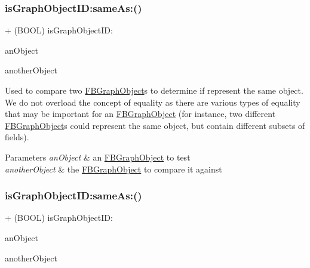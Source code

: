 \subsubsection{\texorpdfstring{is\+Graph\+Object\+I\+D\+:same\+As\+:()}{isGraphObjectID:sameAs:()}\hspace{0.1cm}{\footnotesize\ttfamily [4/5]}}
{\footnotesize\ttfamily + (B\+O\+OL) is\+Graph\+Object\+I\+D\+: \begin{DoxyParamCaption}\item[{(id$<$ \hyperlink{interfaceFBGraphObject}{F\+B\+Graph\+Object} $>$)}]{an\+Object }\item[{sameAs:(id$<$ \hyperlink{interfaceFBGraphObject}{F\+B\+Graph\+Object} $>$)}]{another\+Object }\end{DoxyParamCaption}}

Used to compare two {\ttfamily \hyperlink{interfaceFBGraphObject}{F\+B\+Graph\+Object}}s to determine if represent the same object. We do not overload the concept of equality as there are various types of equality that may be important for an {\ttfamily \hyperlink{interfaceFBGraphObject}{F\+B\+Graph\+Object}} (for instance, two different {\ttfamily \hyperlink{interfaceFBGraphObject}{F\+B\+Graph\+Object}}s could represent the same object, but contain different subsets of fields).


\begin{DoxyParams}{Parameters}
{\em an\+Object} & an {\ttfamily \hyperlink{interfaceFBGraphObject}{F\+B\+Graph\+Object}} to test\\
\hline
{\em another\+Object} & the {\ttfamily \hyperlink{interfaceFBGraphObject}{F\+B\+Graph\+Object}} to compare it against \\
\hline
\end{DoxyParams}
\mbox{\label{interfaceFBGraphObject_a62b9fd3318de27294b10860c9a62160c}} 
\subsubsection{\texorpdfstring{is\+Graph\+Object\+I\+D\+:same\+As\+:()}{isGraphObjectID:sameAs:()}\hspace{0.1cm}{\footnotesize\ttfamily [5/5]}}
{\footnotesize\ttfamily + (B\+O\+OL) is\+Graph\+Object\+I\+D\+: \begin{DoxyParamCaption}\item[{(id$<$ \hyperlink{interfaceFBGraphObject}{F\+B\+Graph\+Object} $>$)}]{an\+Object }\item[{sameAs:(id$<$ \hyperlink{interfaceFBGraphObject}{F\+B\+Graph\+Object} $>$)}]{another\+Object }\end{DoxyParamCaption}}

